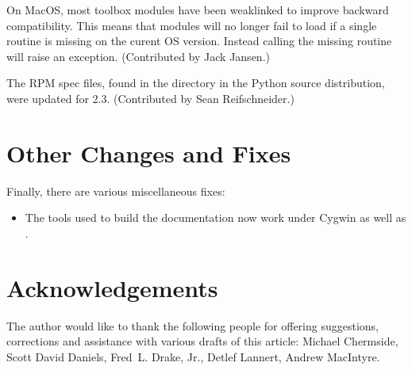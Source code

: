 \documentclass{howto}
\begin{document}
On MacOS, most toolbox modules have been weaklinked to improve
backward compatibility.  This means that modules will no longer fail
to load if a single routine is missing on the curent OS version.
Instead calling the missing routine will raise an exception.
(Contributed by Jack Jansen.)

The RPM spec files, found in the  directory in the
Python source distribution, were updated for 2.3.  (Contributed by
Sean Reifschneider.)


\section{Other Changes and Fixes}

Finally, there are various miscellaneous fixes:

\begin{itemize}

\item The tools used to build the documentation now work under Cygwin
as well as \UNIX.

\end{itemize}


\section{Acknowledgements \label{acks}}

The author would like to thank the following people for offering
suggestions, corrections and assistance with various drafts of this
article: Michael Chermside, Scott David Daniels, Fred~L. Drake, Jr.,
Detlef Lannert, Andrew MacIntyre. 
\end{document}
